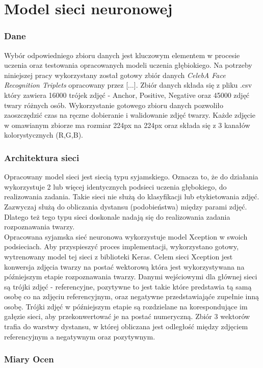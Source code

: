 \section{Model sieci neuronowej}
\subsubsection{Dane}
Wybór odpowiedniego zbioru danych jest kluczowym elementem w procesie uczenia oraz testowania opracowanych modeli uczenia głębiokiego. Na potrzeby niniejszej pracy wykorzystany został gotowy zbiór danych \emph{CelebA Face Recognition Triplets} opracowany przez [...]. Zbiór danych składa się z pliku .csv który zawiera 16000 trójek zdjęć - Anchor, Positive, Negative oraz 45000 zdjęć twary różnych osób. Wykorzystanie gotowego zbioru danych pozwoliło zaoszczędzić czas na ręczne dobieranie i walidowanie zdjęć twarzy.
Każde zdjęcie w omawianym zbiorze ma rozmiar 224px na 224px oraz składa się z 3 kanałów kolorystycznych (R,G,B).
\subsubsection{Architektura sieci}
Opracowany model sieci jest siecią typu syjamskiego. Oznacza to, że do działania wykorzystuje 2 lub więcej identycznych podsieci uczenia głębokiego, do realizowania zadania. Takie sieci nie służą do klasyfikacji lub etykietowania zdjęć. Zazwyczaj służą do obliczania dystansu (podobieństwa) między parami zdjęć. Dlatego też tego typu sieci doskonale nadają się do realizowania zadania rozpoznawania twarzy. \\
Opracowana syjamska sieć neuronowa wykorzystuje model Xception w swoich podsieciach. Aby przyspieszyć proces implementacji, wykorzystano gotowy, wytrenowany model tej sieci z biblioteki Keras. Celem sieci Xception jest konwersja zdjęcia twarzy na postać wektorową która jest wykorzystywana na późniejszym etapie rozpoznawania twarzy.
Danymi wejściowymi dla głównej sieci są trójki zdjęć - referencyjne, pozytywne to jest takie które predstawia tą samą osobę co na zdjęciu referencyjnym, oraz negatywne przedstawiająće zupełnie inną osobę. Trójki zdjęć w późniejszym etapie są rozdzielane na korespondujące im gałęzie sieci, aby przekonwertować je na postać numeryczną. Zbiór 3 wektorów trafia do warstwy dystansu, w której obliczana jest odległość między zdjęciem referencyjnym a negatywnym oraz pozytywnym. 
\subsubsection{Miary Ocen}
